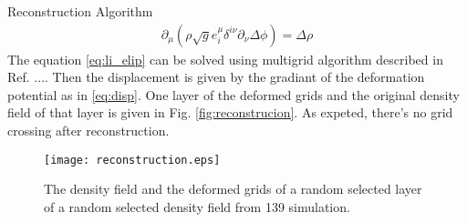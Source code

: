 \begin{section}{Reconstruction Algorithm}
\begin{align}
 \label{eq:li_elip}
    \partial _\mu (\rho \sqrt{g} e^\mu _i \delta^{i\nu}\partial_\nu \Delta \phi)=\Delta \rho
\end{align}
The equation \ref{eq:li_elip} can be solved using multigrid algorithm described in Ref. .... Then the displacement is given by the gradiant of the deformation potential as in \ref{eq:disp}. One layer of the deformed grids and the original density field of that layer is given in Fig. \ref{fig:reconstrucion}. As expeted, there's no grid crossing after reconstruction.
\begin{figure}[htbp]
 \begin{center}
  \texttt{[image: reconstruction.eps]}
   \caption{The density field and the deformed grids of a random selected layer of a random selected density field from 139 simulation.}
  \label{fig:reconstruction}
 \end{center}
\end{figure}


\end{section}
